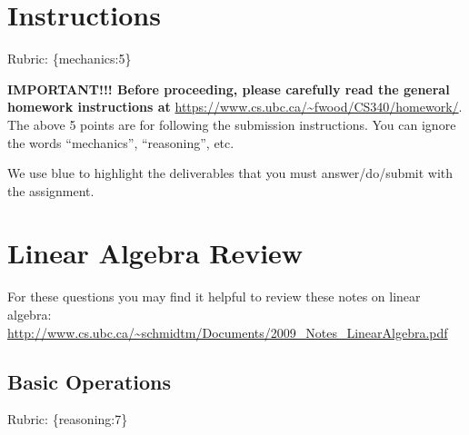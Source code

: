 \documentclass{article}
\def\rubric#1{\gre{Rubric: \{#1\}}}{}
\def\blu#1{{\color{blu}#1}}
\def\gre#1{{\color{gre}#1}}
\begin{document}
\section*{Instructions}
\rubric{mechanics:5}

\textbf{IMPORTANT!!! Before proceeding, please carefully read the general homework instructions at} \url{https://www.cs.ubc.ca/~fwood/CS340/homework/}. The above 5 points are for following the submission instructions. You can ignore the words ``mechanics'', ``reasoning'', etc.

\vspace{1em}
We use \blu{blue} to highlight the deliverables that you must answer/do/submit with the assignment.

\section{Linear Algebra Review}

For these questions you may find it helpful to review these notes on linear algebra:\\
\url{http://www.cs.ubc.ca/~schmidtm/Documents/2009_Notes_LinearAlgebra.pdf}

\subsection{Basic Operations}
\rubric{reasoning:7}
\end{document}

